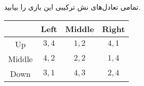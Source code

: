 تمامی تعادل‌های نش ترکیبی این بازی را بیابید.
\LTR 
\begin{center}
\begin{tabular}{c | c c c}
        & Left    & Middle    & Right \\ \hline
    Up      & $3,4$   & $1,2$     & $4,1$ \\
    Middle  & $4,2$   & $2,2$     & $1,4$ \\
    Down    & $3,1$   & $4,3$     & $2,4$ \\
\end{tabular}
\end{center}
\RTL